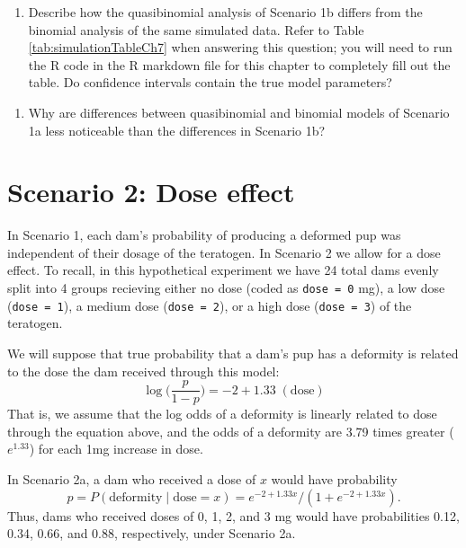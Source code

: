 \documentclass[
]{krantz}
\providecommand{\tightlist}{%
  \setlength{\itemsep}{0pt}\setlength{\parskip}{0pt}}
\renewenvironment{quote}{\begin{VF}}{\end{VF}}
\begin{document}
\begin{quote}
\begin{enumerate}
\def\labelenumi{\arabic{enumi}.}
\setcounter{enumi}{3}
\tightlist
\item
  Describe how the quasibinomial analysis of Scenario 1b differs from the binomial analysis of the same simulated data. Refer to Table \ref{tab:simulationTableCh7} when answering this question; you will need to run the R code in the R markdown file for this chapter to completely fill out the table. Do confidence intervals contain the true model parameters?
\end{enumerate}
\end{quote}

\begin{quote}
\begin{enumerate}
\def\labelenumi{\arabic{enumi}.}
\setcounter{enumi}{4}
\tightlist
\item
  Why are differences between quasibinomial and binomial models of Scenario 1a less noticeable than the differences in Scenario 1b?
\end{enumerate}
\end{quote}

\hypertarget{scenario-2-dose-effect}{%
\section{Scenario 2: Dose effect}\label{scenario-2-dose-effect}}

In Scenario 1, each dam's probability of producing a deformed pup was independent of their dosage of the teratogen. In Scenario 2 we allow for a dose effect. To recall, in this hypothetical experiment we have 24 total dams evenly split into 4 groups recieving either no dose (coded as \texttt{dose\ =\ 0} mg), a low dose (\texttt{dose\ =\ 1}), a medium dose (\texttt{dose\ =\ 2}), or a high dose (\texttt{dose\ =\ 3}) of the teratogen.

We will suppose that true probability that a dam's pup has a deformity is related to the dose the dam received through this model:
\[ \log \bigg(\frac{p}{1-p} \bigg) = -2 + 1.33\; (\textrm{dose}) \]
That is, we assume that the log odds of a deformity is linearly related to dose through the equation above, and the odds of a deformity are 3.79 times greater (\(e^{1.33}\)) for each 1mg increase in dose.

In Scenario 2a, a dam who received a dose of \(x\) would have probability
\[p = P(\textrm{deformity}\mid \textrm{dose} = x) = e^{-2+1.33x}/(1+e^{-2+1.33x}). \]
Thus, dams who received doses of 0, 1, 2, and 3 mg would have probabilities 0.12, 0.34, 0.66, and 0.88, respectively, under Scenario 2a.
\end{document}
